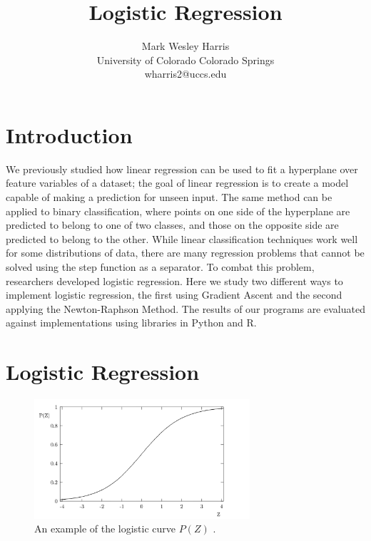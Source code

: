 \documentclass[letterpaper]{article} %
\title{Logistic Regression}
\author{Mark Wesley Harris\\ %
University of Colorado Colorado Springs\\
wharris2@uccs.edu %
}
\begin{document}
\maketitle

\section{Introduction}
We previously studied how
linear regression can be used
to fit a hyperplane over feature variables of a dataset;
the goal of linear regression is to create a model capable of making a prediction for unseen input.
The same method can be applied to binary classification,
where points on one side of the hyperplane are predicted to belong to one of two classes,
and those on the opposite side are predicted to belong to the other.
While linear classification techniques work well for some distributions of data,
there are many regression problems that
cannot be solved using the step function as a separator.
To combat this problem, researchers developed logistic regression.
Here we study two different ways to implement logistic regression,
the first using Gradient Ascent and the second applying the Newton-Raphson Method.
The results of our programs are evaluated against implementations using libraries in Python and R.

\section{Logistic Regression}
\begin{figure}[htbp]
\centerline{\includegraphics[width=8cm]{sigmoid.png}}
\caption{An example of the logistic curve $P(Z)$
\cite{origins}.}
\label{fig:sigmoid}
\end{figure}
\end{document}
